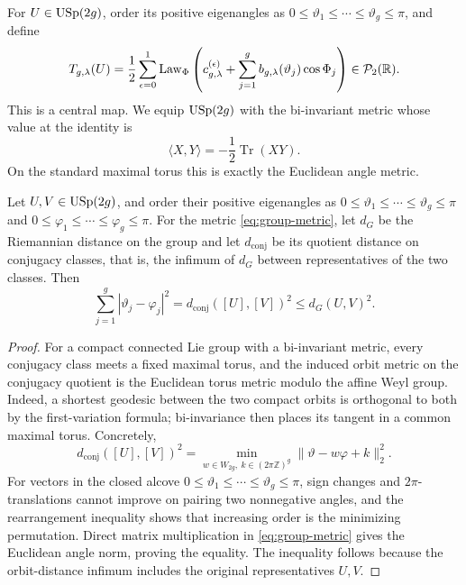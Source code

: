 For \(U\in\mathrm{USp}(2g)\), order its positive eigenangles as
\(0\le\vartheta_1\le\cdots\le\vartheta_g\le\pi\), and define
\begin{equation}
 T_{g,\lambda}(U)
 =\frac12\sum_{\epsilon=0}^1
 \operatorname{Law}_\Phi\left(c_{g,\lambda}^{(\epsilon)}+
       \sum_{j=1}^g b_{g,\lambda}(\vartheta_j)\cos\Phi_j\right)
 \in\mathcal P_2(\mathbb R).
\label{eq:T-map}
\end{equation}
This is a central map.  We equip \(\mathrm{USp}(2g)\) with the bi-invariant metric
whose value at the identity is
\begin{equation}
 \langle X,Y\rangle=-\frac12\operatorname{Tr}(XY).
\label{eq:group-metric}
\end{equation}
On the standard maximal torus this is exactly the Euclidean angle metric.

\begin{lemma}
\label{lem:conjugacy-quotient-metric}
Let \(U,V\in\mathrm{USp}(2g)\), and order their positive eigenangles as
\(0\le\vartheta_1\le\cdots\le\vartheta_g\le\pi\) and
\(0\le\varphi_1\le\cdots\le\varphi_g\le\pi\).  For the metric
\eqref{eq:group-metric}, let \(d_G\) be the Riemannian distance on the group
and let \(d_{\mathrm{conj}}\) be its quotient distance on conjugacy classes,
that is, the infimum of \(d_G\) between representatives of the two classes.
Then
\[
 \sum_{j=1}^g|\vartheta_j-\varphi_j|^2
 =d_{\mathrm{conj}}([U],[V])^2
 \le d_G(U,V)^2.
\]
\end{lemma}

\begin{proof}
For a compact connected Lie group with a bi-invariant metric, every conjugacy
class meets a fixed maximal torus, and the induced orbit metric on the
conjugacy quotient is the Euclidean torus metric modulo the affine Weyl group.
Indeed, a shortest geodesic between the two compact orbits is orthogonal to
both by the first-variation formula; bi-invariance then places its tangent in
a common maximal torus.  Concretely,
\[
 d_{\mathrm{conj}}([U],[V])^2
 =\min_{w\in W_{2g},\ k\in(2\pi\mathbb Z)^g}
      \|\vartheta-w\varphi+k\|_2^2.
\]
For vectors in the closed alcove
\(0\le\vartheta_1\le\cdots\le\vartheta_g\le\pi\), sign changes and
\(2\pi\)-translations cannot improve on pairing two nonnegative angles, and
the rearrangement inequality shows that increasing order is the minimizing
permutation.  Direct matrix
multiplication in \eqref{eq:group-metric} gives the Euclidean angle norm,
proving the equality.  The inequality follows because the orbit-distance
infimum includes the original representatives \(U,V\).
\end{proof}

